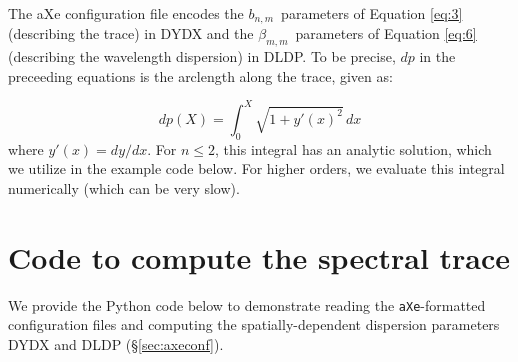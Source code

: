 \documentclass[preprint]{aastex}
\begin{document}
The aXe configuration file encodes the $b_{n,m}$\ parameters of Equation \ref{eq:3} (describing the trace) in DYDX and the $\beta_{m,m}$\ parameters of Equation \ref{eq:6} (describing the wavelength dispersion) in DLDP.  To be precise, $dp$ in the preceeding equations is the arclength along the trace, given as:

\begin{dmath}
dp(X) = \int_{0}^{X} \sqrt{1+y'(x)^2}\, dx
\label{eq:dldp}
\end{dmath}
where $y'(x) = dy/dx$.  For $n\leq2$, this integral has an analytic solution, which we 
utilize in the example code below.  For higher orders, we evaluate this integral numerically (which 
can be very slow).





\section{Code to compute the spectral trace}\label{sec:examplecode}
We provide the Python code below to demonstrate reading the \texttt{aXe}-formatted configuration files and computing the spatially-dependent dispersion parameters DYDX and DLDP (\S\ref{sec:axeconf}).

\vspace{1cm}


\end{document}
